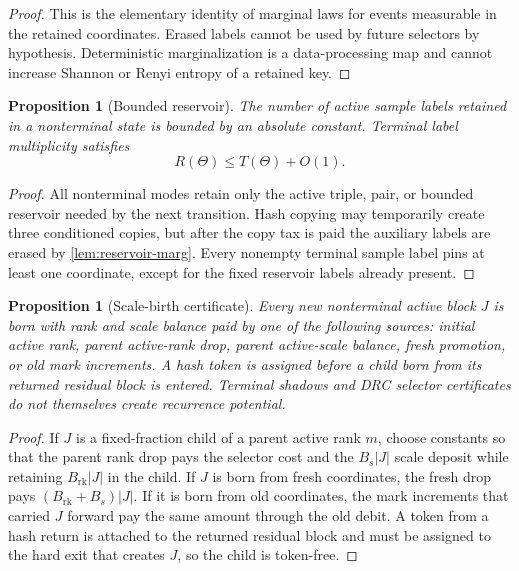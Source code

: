 \documentclass[11pt]{article}
\newcommand{\Cref}[1]{\ref{#1}}
\newtheorem{proposition}[theorem]{Proposition}
\theoremstyle{remark}
\newcommand{\rk}{\mathrm{rk}}
\begin{document}
\begin{proof}
This is the elementary identity of marginal laws for events measurable in the retained coordinates.  Erased labels cannot be used by future selectors by hypothesis.  Deterministic marginalization is a data-processing map and cannot increase Shannon or Renyi entropy of a retained key.
\end{proof}

\begin{proposition}[Bounded reservoir]\label{prop:reservoir}
The number of active sample labels retained in a nonterminal state is bounded by an absolute constant.  Terminal label multiplicity satisfies
\[
        R(\Theta)\le T(\Theta)+O(1).
\]
\end{proposition}

\begin{proof}
All nonterminal modes retain only the active triple, pair, or bounded reservoir needed by the next transition.  Hash copying may temporarily create three conditioned copies, but after the copy tax is paid the auxiliary labels are erased by \Cref{lem:reservoir-marg}.  Every nonempty terminal sample label pins at least one coordinate, except for the fixed reservoir labels already present.
\end{proof}

\begin{proposition}[Scale-birth certificate]\label{prop:scale-birth}
Every new nonterminal active block $J$ is born with rank and scale balance paid by one of the following sources: initial active rank, parent active-rank drop, parent active-scale balance, fresh promotion, or old mark increments.  A hash token is assigned before a child born from its returned residual block is entered.  Terminal shadows and DRC selector certificates do not themselves create recurrence potential.
\end{proposition}

\begin{proof}
If $J$ is a fixed-fraction child of a parent active rank $m$, choose constants so that the parent rank drop pays the selector cost and the $B_s|J|$ scale deposit while retaining $B_{\rk}|J|$ in the child.  If $J$ is born from fresh coordinates, the fresh drop pays $(B_{\rk}+B_s)|J|$.  If it is born from old coordinates, the mark increments that carried $J$ forward pay the same amount through the old debit.  A token from a hash return is attached to the returned residual block and must be assigned to the hard exit that creates $J$, so the child is token-free.
\end{proof}
\end{document}
